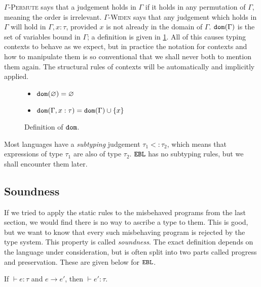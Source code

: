 \textsc{$\Gamma$-Permute} says that a judgement holds in $\Gamma$ if it holds in any permutation of $\Gamma$, meaning the order is irrelevant. \textsc{$\Gamma$-Widen} says that any judgement which holds in $\Gamma$ will hold in $\Gamma, x: \tau$, provided $x$ is not already in the domain of $\Gamma$. $\mathtt{dom}(\Gamma)$ is the set of variables bound in $\Gamma$; a definition is given in \ref{fig:ctx_dom_defn}. All of this causes typing contexts to behave as we expect, but in practice the notation for contexts and how to manipulate them is so conventional that we shall never both to mention them again. The structural rules of contexts will be automatically and implicitly applied.

\begin{figure}[h]


\begin{itemize}
	\setlength\itemsep{-0.7em}
	\item[] $\mathtt{dom}(\varnothing) = \varnothing$
	\item[] $\mathtt{dom}(\Gamma, x: \tau) = \mathtt{dom}(\Gamma) \cup \{ x \}$
\end{itemize}

\vspace{-12pt}
\caption{Definition of $\mathtt{dom}$.}
\label{fig:ctx_dom_defn}
\end{figure}

Most languages have a \textit{subtyping} judgement $\tau_1 <: \tau_2$, which means that expressions of type $\tau_1$ are also of type $\tau_2$. $\mathtt{EBL}$ has no subtyping rules, but we shall encounter them later.

\subsection{Soundness}

If we tried to apply the static rules to the misbehaved programs from the last section, we would find there is no way to ascribe a type to them. This is good, but we want to know that every such misbehaving program is rejected by the type system. This property is called \textit{soundness}. The exact definition depends on the language under consideration, but is often split into two parts called progress and preservation. These are given below for $\mathtt{EBL}$.

\begin{theorem}
If $\vdash e: \tau$ and $e \longrightarrow e'$, then $\vdash e': \tau$.
\end{theorem}

